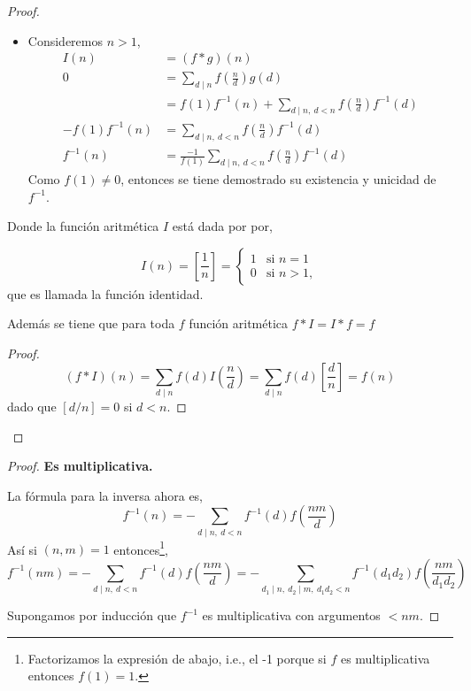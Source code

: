 \documentclass[letterpaper]{article}
\begin{document}
\begin{enumerate}
\begin{proof}
\begin{itemize}
    \item Consideremos $n > 1$,
    \begin{align*}
        I(n)
            &= (f \ast g) (n)\\
        0
            &= \sum_{d \mid n} f \left(\frac{n}{d}\right)g(d)\\
            &= f(1)f^{-1}(n) + \sum_{d \mid n, \ d < n} f \left(\frac{n}{d}\right)f^{-1}(d)\\
        -f(1)f^{-1}(n)
            &= \sum_{d \mid n, \ d < n} f \left(\frac{n}{d}\right)f^{-1}(d)\\
        f^{-1}(n)
            &= \frac{-1}{f(1)} \sum_{d \mid n, \ d < n} f \left(\frac{n}{d}\right)f^{-1}(d)
    \end{align*}
    Como $f(1) \neq 0$, entonces se tiene demostrado su existencia y unicidad de $f^{-1}$.
\end{itemize}

Donde la función aritmética $I$ está dada por por,

\[
    I(n) = \left[{\frac{1}{n}}\right] =
    \begin{cases}
        1 & \text{si } n = 1\\
        0 & \text{si } n > 1,
    \end{cases}
\]
que es llamada la función identidad.

Además se tiene que para toda $f$ función aritmética $f \ast I = I \ast f = f$
\begin{proof}
    \begin{equation*}
        (f \ast I) (n) = \sum_{d \mid n} f(d) I\left(\frac{n}{d}\right)
            = \sum_{d \mid n} f(d) \left[\frac{d}{n}\right] = f(n)
    \end{equation*}
    dado que $[d/n] = 0$ si $d < n$.
\end{proof}
\end{proof}

\begin{proof} \textbf{Es multiplicativa.}

La fórmula para la inversa ahora es,
\[
    f^{-1}(n) = - \sum_{d \mid n, \  d < n} f^{-1}(d) f \left(\frac{nm}{d}\right)
\]
Así si $(n,m) = 1$ entonces\footnote{
    Factorizamos la expresión de abajo, i.e., el -1 porque si $f$ es multiplicativa entonces $f(1)=1$.
},
\[
    f^{-1}(nm) = - \sum_{d \mid n, \  d < n} f^{-1}(d) f \left(\frac{nm}{d}\right)
        = - \sum_{d_1 \mid n,\ d_2 \mid m,\  d_1 d_2 < n} f^{-1}(d_1d_2) f \left(\frac{nm}{d_1d_2}\right)
\]

Supongamos por inducción que $f^{-1}$ es multiplicativa con argumentos $< nm$.


\end{proof}
\end{enumerate}
\end{document}

